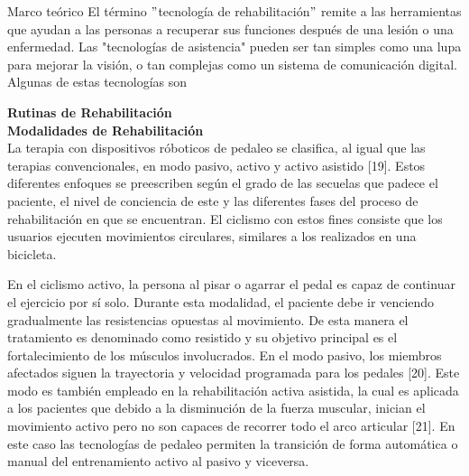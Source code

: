 \begin{thesischapter}{1} {Marco teórico}
    \vspace{10pt}
    El término $"$tecnología de rehabilitación$"$ remite a las herramientas que ayudan a las personas 
    a recuperar sus funciones después de una lesión o una enfermedad. Las "tecnologías de asistencia" 
    pueden ser tan simples como una lupa para mejorar la visión, o tan complejas como un sistema de 
    comunicación digital. Algunas de estas tecnologías son

    \vspace{10pt}
    \textbf{Rutinas de Rehabilitación} \\ 

    \vspace{10pt}
    \textbf{Modalidades de Rehabilitación} \\ 
    La terapia con dispositivos róboticos de pedaleo se clasifica, al igual que las terapias
    convencionales, en modo pasivo, activo y activo asistido [19]. Estos diferentes enfoques
    se preescriben según el grado de las secuelas que padece el paciente, el nivel de
    conciencia de este y las diferentes fases del proceso de rehabilitación en que se
    encuentran. El ciclismo con estos fines consiste que los usuarios ejecuten movimientos
    circulares, similares a los realizados en una bicicleta.

    \vspace{5pt}
    En el ciclismo activo, la persona al pisar o agarrar el pedal es capaz de continuar el
    ejercicio por sí solo. Durante esta modalidad, el paciente debe ir venciendo gradualmente
    las resistencias opuestas al movimiento. De esta manera el tratamiento es denominado
    como resistido y su objetivo principal es el fortalecimiento de los músculos involucrados.
    En el modo pasivo, los miembros afectados siguen la trayectoria y velocidad programada
    para los pedales [20]. Este modo es también empleado en la rehabilitación activa asistida,
    la cual es aplicada a los pacientes que debido a la disminución de la fuerza muscular,
    inician el movimiento activo pero no son capaces de recorrer todo el arco articular [21].
    En este caso las tecnologías de pedaleo permiten la transición de forma automática o
    manual del entrenamiento activo al pasivo y viceversa.


\end{thesischapter}
